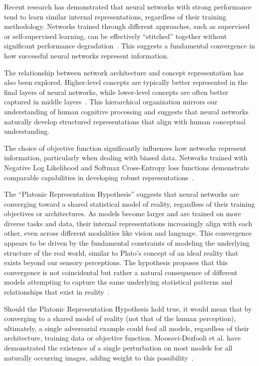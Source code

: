 \documentclass[a4paper, oneside]{discothesis}
\begin{document}
Recent research has demonstrated that neural networks with strong performance tend to learn similar internal representations, regardless of their training methodology. Networks trained through different approaches, such as supervised or self-supervised learning, can be effectively ``stitched'' together without significant performance degradation~\cite{bansal2021revisiting}. This suggests a fundamental convergence in how successful neural networks represent information.

The relationship between network architecture and concept representation has also been explored. Higher-level concepts are typically better represented in the final layers of neural networks, while lower-level concepts are often better captured in middle layers~\cite{Agafonov2022AnEO, Agafonov2022LocalizationOO}. This hierarchical organization mirrors our understanding of human cognitive processing and suggests that neural networks naturally develop structured representations that align with human conceptual understanding.

The choice of objective function significantly influences how networks represent information, particularly when dealing with biased data. Networks trained with Negative Log Likelihood and Softmax Cross-Entropy loss functions demonstrate comparable capabilities in developing robust representations~\cite{bangaru2022interpreting}.

The ``Platonic Representation Hypothesis'' suggests that neural networks are converging toward a shared statistical model of reality, regardless of their training objectives or architectures. As models become larger and are trained on more diverse tasks and data, their internal representations increasingly align with each other, even across different modalities like vision and language. This convergence appears to be driven by the fundamental constraints of modeling the underlying structure of the real world, similar to Plato's concept of an ideal reality that exists beyond our sensory perceptions. The hypothesis proposes that this convergence is not coincidental but rather a natural consequence of different models attempting to capture the same underlying statistical patterns and relationships that exist in reality~\cite{huh2024platonic}. 

Should the Platonic Representation Hypothesis hold true, it would mean that by converging to a shared model of reality (not that of the human perception), ultimately, a single adversarial example could fool all models, regardless of their architecture, training data or objective function. Moosavi-Dezfooli et al. have demonstrated the existence of a single perturbation on most models for all naturally occurring images, adding weight to this possibility~\cite{moosavi2017universal}.
\end{document}
